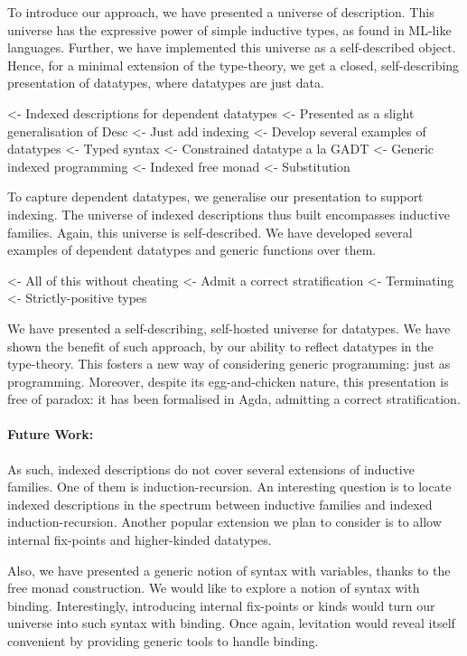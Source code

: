 \documentclass[preprint
              , authoryear
              ]{sigplanconf}
\newenvironment{wstructure}{\comment}{\endcomment}
\begin{document}
To introduce our approach, we have presented a universe of
description. This universe has the expressive power of simple
inductive types, as found in ML-like languages. Further, we have
implemented this universe as a self-described object. Hence, for a
minimal extension of the type-theory, we get a closed, self-describing
presentation of datatypes, where datatypes are just data.

\begin{wstructure}
<- Indexed descriptions for dependent datatypes
    <- Presented as a slight generalisation of Desc
        <- Just add indexing
    <- Develop several examples of datatypes
        <- Typed syntax
        <- Constrained datatype a la GADT
    <- Generic indexed programming
        <- Indexed free monad
        <- Substitution
\end{wstructure}

To capture dependent datatypes, we generalise our presentation to
support indexing. The universe of indexed descriptions thus built
encompasses inductive families. Again, this universe is
self-described. We have developed several examples of dependent
datatypes and generic functions over them.

\begin{wstructure}
<- All of this without cheating
    <- Admit a correct stratification
    <- Terminating
    <- Strictly-positive types
\end{wstructure}

We have presented a self-describing, self-hosted universe for
datatypes. We have shown the benefit of such approach, by our ability
to reflect datatypes in the type-theory. This fosters a new way of
considering generic programming: just as programming. Moreover,
despite its egg-and-chicken nature, this presentation is free of
paradox: it has been formalised in Agda, admitting a correct
stratification.

\paragraph{Future Work:} As such, indexed descriptions do
not cover several extensions of inductive families. One of them is
induction-recursion. An interesting question is to locate indexed
descriptions in the spectrum between inductive families and indexed
induction-recursion. Another popular extension we plan to consider is
to allow internal fix-points and higher-kinded datatypes.

Also, we have presented a generic notion of syntax with variables,
thanks to the free monad construction. We would like to explore a
notion of syntax with binding. Interestingly, introducing internal
fix-points or kinds would turn our universe into such syntax with
binding. Once again, levitation would reveal itself convenient by
providing generic tools to handle binding.
\end{document}
